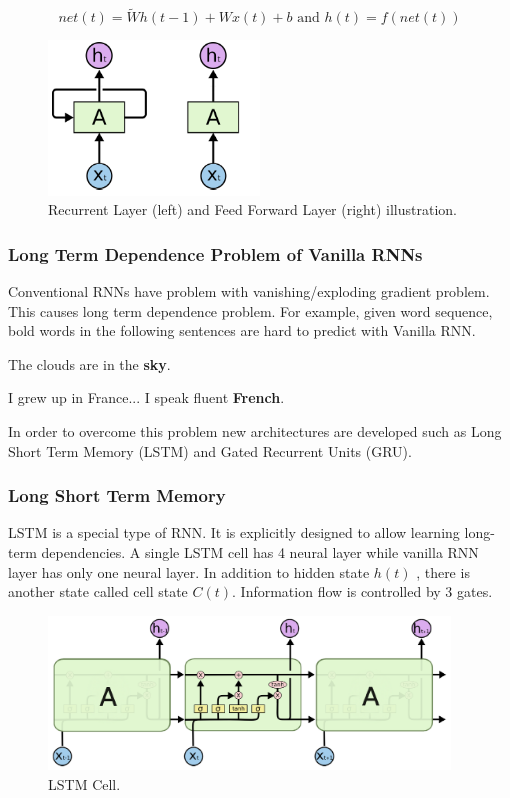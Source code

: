 \begin{equation}
\label{eqn:rnnact}
net(t) = \tilde{W} h(t-1) + W x(t) + b \text{ and } h(t) = f(net(t))
\end{equation}


\begin{figure}
	\centering
	\includegraphics[width=0.5\textwidth]{figures/ml_theory/rnn_vs_ffnn_layer.png}
	\caption{Recurrent Layer (left) and Feed Forward Layer (right) illustration.}
	\label{fig:rnn_vs_ffnn}
\end{figure}

\subsubsection{Long Term Dependence Problem of Vanilla RNNs}
Conventional RNNs have problem with vanishing/exploding gradient problem. This causes long term dependence problem. For example, given word sequence, bold words in the following sentences are hard to predict with Vanilla RNN.

\centerline{The clouds are in the \textbf{sky}.}
\centerline{I grew up in France... I speak fluent \textbf{French}.}

In order to overcome this problem new architectures are developed such as Long Short Term Memory (LSTM) and Gated Recurrent Units (GRU).

\subsubsection{Long Short Term Memory}
LSTM is a special type of RNN. It is explicitly designed to allow learning long-term dependencies. A single LSTM cell has 4 neural layer while vanilla RNN layer has only one neural layer. In addition to hidden state $h(t)$ , there is another state called cell state $C(t)$. Information flow is controlled by 3 gates. 

\begin{figure}
	\centering
	\includegraphics[width=0.95\textwidth]{figures/ml_theory/lstm/lstm_module.png}
	\caption{LSTM Cell.}
	\label{fig:lstm_cell}
\end{figure}

